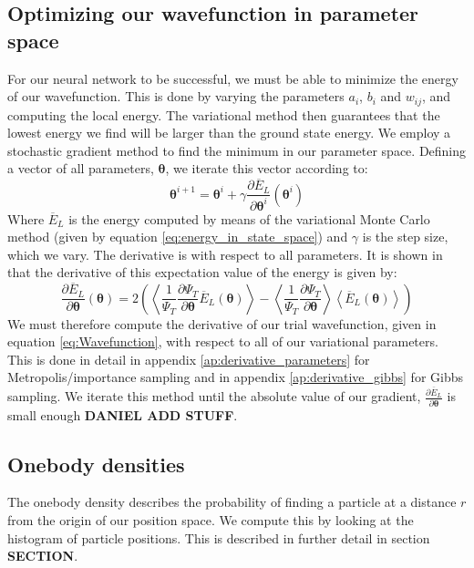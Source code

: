 \documentclass[a4paper, 10pt]{article}
\begin{document}
	\subsection{Optimizing our wavefunction in parameter space}
	For our neural network to be successful, we must be able to minimize the energy of our wavefunction. This is done by varying the parameters $a_i$, $b_i$ and $w_{ij}$, and computing the local energy. The variational method then guarantees that the lowest energy we find will be larger than the ground state energy. We employ a stochastic gradient method to find the minimum in our parameter space. Defining a vector of all parameters, $\boldsymbol{\theta}$, we iterate this vector according to:
	\begin{equation}\label{eq:Minimization_theory}
	\boldsymbol{\theta}^{i+1}=\boldsymbol{\theta}^i + \gamma \frac{\partial \overline{E}_L}{\partial \boldsymbol{\theta}^i}(\boldsymbol{\theta}^i)
	\end{equation}
	Where $\overline{E}_L$ is the energy computed by means of the variational Monte Carlo method (given by equation \ref{eq:energy_in_state_space}) and $\gamma$ is the step size, which we vary. The derivative is with respect to all parameters. It is shown in \cite{Heinsen2018} that the derivative of this expectation value of the energy is given by:
	\begin{equation}
	\frac{\partial \overline{E}_L}{\partial \boldsymbol{\theta}}(\boldsymbol{\theta})=2\left(\left\langle \frac{1}{\Psi_T}\frac{\partial \Psi_T}{\partial \boldsymbol{\theta}}\overline{E}_L(\boldsymbol{\theta})\right\rangle-\left\langle \frac{1}{\Psi_T}\frac{\partial \Psi_T}{\partial \boldsymbol{\theta}}\right\rangle\left\langle \overline{E}_L(\boldsymbol{\theta})\right\rangle\right)
	\end{equation}
	We must therefore compute the derivative of our trial wavefunction, given in equation \ref{eq:Wavefunction}, with respect to all of our variational parameters.
	This is done in detail in appendix \ref{ap:derivative_parameters} for Metropolis/importance sampling and in appendix \ref{ap:derivative_gibbs} for Gibbs sampling. We iterate this method until the absolute value of our gradient, $\frac{\partial \overline{E}_L}{\partial \boldsymbol{\theta}}$  is small enough \textbf{DANIEL ADD STUFF}.
	\subsection{Onebody densities}
	The onebody density describes the probability of finding a particle at a distance $r$ from the origin of our position space.	We compute this by looking at the histogram of particle positions. This is described in further detail in section \textbf{SECTION}.
	
\end{document}
